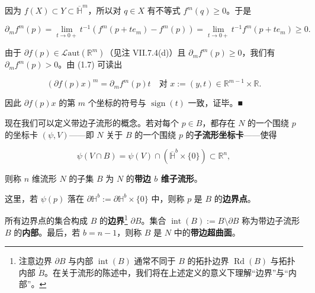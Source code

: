 \begin{remark}
\begin{items}
因为 $ f(X) \subset Y \subset \overline{\mathbb{H}}^m $，所以对 $ q \in X $ 有不等式 $ f^m(q) \ge 0 $。于是

\[
\partial_m f^m(p) = \lim_{t \to 0+} t^{-1}\left(f^m(p + te_m) - f^m(p)\right) = \lim_{t \to 0+} t^{-1} f^m(p + te_m) \ge 0 .
\]

由于 $ \partial f(p) \in \mathcal{L}\mathrm{aut}(\mathbb{R}^m) $（见注 VII.7.4(d)）且 $ \partial_m f^m(p) \ge 0 $，我们有 $ \partial_m f^m(p) > 0 $。由 (1.7) 可读出

\[
(\partial f(p)x)^m = \partial_m f^m(p)t \quad \text{对 } x := (y,t) \in \mathbb{R}^{m-1}\times\mathbb{R} .
\]

因此 $ \partial f(p)x $ 的第 $ m $ 个坐标的符号与 $ \operatorname{sign}(t) $ 一致，证毕。\nobreak\hspace{0.35em}■

\end{items}

现在我们可以定义带边子流形的概念。若对每个 $ p \in B $，都存在 $ N $ 的一个围绕 $ p $ 的坐标卡 $ (\psi,V) $——即 $ N $ 关于 $ B $ 的一个围绕 $ p $ 的\textbf{子流形坐标卡}——使得

\begin{equation}
\psi(V\cap B) = \psi(V)\cap(\overline{\mathbb{H}}^b\times\{0\}) \subset \mathbb{R}^n ,\tag{1.8}
\end{equation}

则称 $ n $ 维流形 $ N $ 的子集 $ B $ 为 $ N $ 的\textbf{带边 $ b $ 维子流形}。

这里，若 $ \psi(p) $ 落在 $ \partial\mathbb{H}^b := \partial\mathbb{H}^b\times\{0\} $ 中，则称 $ p $ 是 $ B $ 的\textbf{边界点}。


所有边界点的集合构成 $ B $ 的\textbf{边界}\footnote{注意边界 $ \partial B $ 与内部 $ \operatorname{int}(B) $ 通常不同于 $ B $ 的拓扑边界 $ \operatorname{Rd}(B) $ 与拓扑内部 $ \mathring{B} $。在关于流形的陈述中，我们将在上述定义的意义下理解“边界”与“内部”。} $ \partial B $。集合 $ \operatorname{int}(B) := B\setminus\partial B $ 称为带边子流形 $ B $ 的\textbf{内部}。最后，若 $ b = n-1 $，则称 $ B $ 是 $ N $ 中的\textbf{带边超曲面}。

\end{remark}

